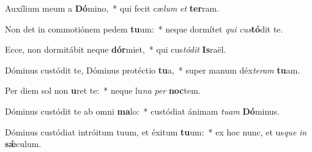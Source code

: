 \item Auxílium meum a \textbf{Dó}mino,~* qui fecit cæ\textit{lum} \textit{et} \textbf{ter}ram.
\item Non det in commotiónem pedem \textbf{tu}um:~* neque dormítet \textit{qui} \textit{cus}\textbf{tó}dit te.
\item Ecce, non dormitábit neque \textbf{dór}miet,~* qui cus\textit{tó}\textit{dit} \textbf{Is}raël.
\item Dóminus custódit te, Dóminus protéctio \textbf{tu}a,~* super manum déx\textit{te}\textit{ram} \textbf{tu}am.
\item Per diem sol non \textbf{u}ret te:~* neque lu\textit{na} \textit{per} \textbf{noc}tem.
\item Dóminus custódit te ab omni \textbf{ma}lo:~* custódiat ánimam \textit{tu}\textit{am} \textbf{Dó}minus.
\item Dóminus custódiat intróitum tuum, et éxitum \textbf{tu}um:~* ex hoc nunc, et us\textit{que} \textit{in} \textbf{sǽ}culum.
